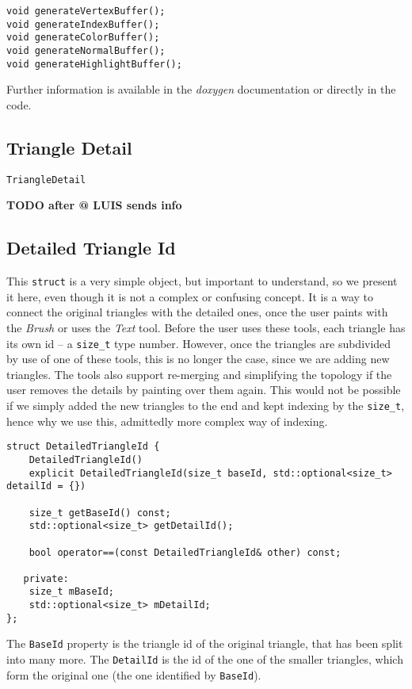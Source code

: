 \begin{lstlisting}
void generateVertexBuffer();
void generateIndexBuffer();
void generateColorBuffer();
void generateNormalBuffer();
void generateHighlightBuffer();
\end{lstlisting}

Further information is available in the \textit{doxygen} documentation or directly in the code.

\subsection{Triangle Detail}

\texttt{TriangleDetail}

\textbf{TODO after @ LUIS sends info}

\subsection{Detailed Triangle Id}

This \texttt{struct} is a very simple object, but important to understand, so we present it here, even though it is not a complex or confusing concept. It is a way to connect the original triangles with the detailed ones, once the user paints with the \textit{Brush} or uses the \textit{Text} tool. Before the user uses these tools, each triangle has its own id -- a \texttt{size\_t} type number. However, once the triangles are subdivided by use of one of these tools, this is no longer the case, since we are adding new triangles. The tools also support re-merging and simplifying the topology if the user removes the details by painting over them again. This would not be possible if we simply added the new triangles to the end and kept indexing by the \texttt{size\_t}, hence why we use this, admittedly more complex way of indexing.

\begin{lstlisting}
struct DetailedTriangleId {
    DetailedTriangleId()
    explicit DetailedTriangleId(size_t baseId, std::optional<size_t> detailId = {})

    size_t getBaseId() const;
    std::optional<size_t> getDetailId();

    bool operator==(const DetailedTriangleId& other) const;

   private:
    size_t mBaseId;
    std::optional<size_t> mDetailId;
};
\end{lstlisting}

The \texttt{BaseId} property is the triangle id of the original triangle, that has been split into many more. The \texttt{DetailId} is the id of the one of the smaller triangles, which form the original one (the one identified by \texttt{BaseId}).

